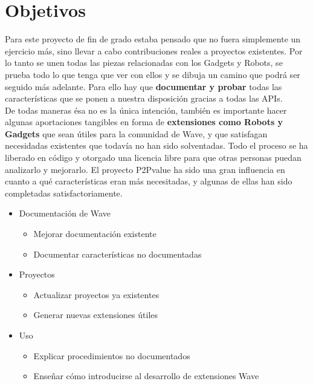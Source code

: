 \section{Objetivos}
Para este proyecto de fin de grado estaba pensado que no fuera simplemente un ejercicio más, sino llevar a cabo contribuciones reales a proyectos existentes. Por lo tanto se unen todas las piezas relacionadas con los Gadgets y Robots, se  prueba todo lo que tenga que ver con ellos y se dibuja un camino que podrá ser seguido más adelante. Para ello hay que \textbf{documentar y probar} todas las características que se ponen a nuestra disposición gracias a todas las APIs.\\[.2cm]
De todas maneras ésa no es la única intención, también es importante hacer algunas aportaciones tangibles en forma de \textbf{extensiones como Robots y Gadgets} que sean útiles para la comunidad de Wave, y que satisfagan necesidadas existentes que todavía no han sido solventadas. Todo el proceso se ha liberado en código y otorgado una licencia libre \cite{ref:agpl} para que otras personas puedan analizarlo y mejorarlo. El proyecto P2Pvalue \cite{ref:p2pvalue} ha sido una gran influencia en cuanto a qué características eran más necesitadas, y algunas de ellas han sido completadas satisfactoriamente.
\begin{itemize}
  \item {
    Documentación de Wave
    \begin{itemize}
      \item Mejorar documentación existente
      \item Documentar características no documentadas
    \end{itemize}
  }
  \item {
    Proyectos
    \begin{itemize}
      \item Actualizar proyectos ya existentes
      \item Generar nuevas extensiones útiles
    \end{itemize}
  }
  \item {
    Uso
    \begin{itemize}
      \item Explicar procedimientos no documentados
      \item Enseñar cómo introducirse al desarrollo de extensiones Wave
    \end{itemize}
  }
\end{itemize}


